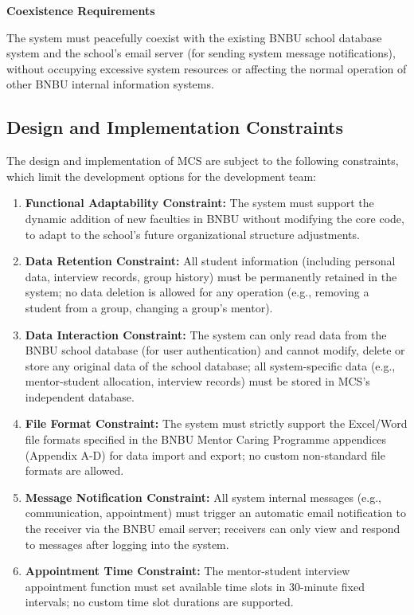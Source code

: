 \documentclass[a4paper,12pt]{article}
\begin{document}
\textbf{Coexistence Requirements}

The system must peacefully coexist with the existing BNBU school database system and the school's email server (for sending system message notifications), without occupying excessive system resources or affecting the normal operation of other BNBU internal information systems.

\subsection{Design and Implementation Constraints}

The design and implementation of MCS are subject to the following constraints, which limit the development options for the development team:

\begin{enumerate}
\item \textbf{Functional Adaptability Constraint:} The system must support the dynamic addition of new faculties in BNBU without modifying the core code, to adapt to the school's future organizational structure adjustments.
\item \textbf{Data Retention Constraint:} All student information (including personal data, interview records, group history) must be permanently retained in the system; no data deletion is allowed for any operation (e.g., removing a student from a group, changing a group's mentor).
\item \textbf{Data Interaction Constraint:} The system can only read data from the BNBU school database (for user authentication) and cannot modify, delete or store any original data of the school database; all system-specific data (e.g., mentor-student allocation, interview records) must be stored in MCS's independent database.
\item \textbf{File Format Constraint:} The system must strictly support the Excel/Word file formats specified in the BNBU Mentor Caring Programme appendices (Appendix A-D) for data import and export; no custom non-standard file formats are allowed.
\item \textbf{Message Notification Constraint:} All system internal messages (e.g., communication, appointment) must trigger an automatic email notification to the receiver via the BNBU email server; receivers can only view and respond to messages after logging into the system.
\item \textbf{Appointment Time Constraint:} The mentor-student interview appointment function must set available time slots in 30-minute fixed intervals; no custom time slot durations are supported.

\end{enumerate}
\end{document}
